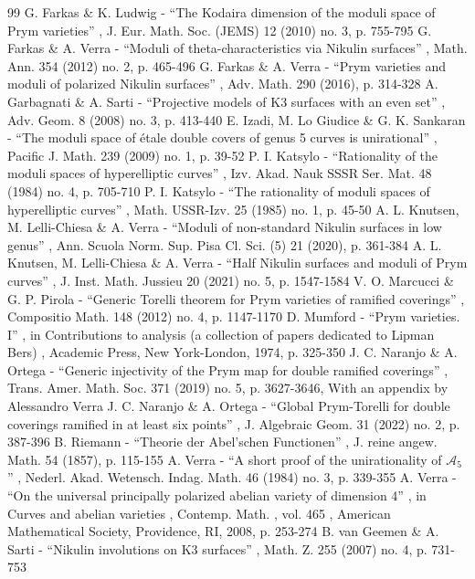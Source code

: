 \documentclass[11pt]{article}
\theoremstyle{plain}
\theoremstyle{definition}
\begin{document}
\begin{thebibliography}{99}
 G. Farkas \& K. Ludwig - “The Kodaira dimension of the moduli space of Prym varieties” , J. Eur. Math. Soc. (JEMS) 12 (2010) no. 3, p. 755-795
 G. Farkas \& A. Verra - “Moduli of theta-characteristics via Nikulin surfaces” , Math. Ann. 354 (2012) no. 2, p. 465-496
 G. Farkas \& A. Verra - “Prym varieties and moduli of polarized Nikulin surfaces” , Adv. Math. 290 (2016), p. 314-328
 A. Garbagnati \& A. Sarti - “Projective models of K3 surfaces with an even set” , Adv. Geom. 8 (2008) no. 3, p. 413-440
 E. Izadi, M. Lo Giudice \& G. K. Sankaran - “The moduli space of étale double covers of genus 5 curves is unirational” , Pacific J. Math. 239 (2009) no. 1, p. 39-52
 P. I. Katsylo - “Rationality of the moduli spaces of hyperelliptic curves” , Izv. Akad. Nauk SSSR Ser. Mat. 48 (1984) no. 4, p. 705-710
 P. I. Katsylo - “The rationality of moduli spaces of hyperelliptic curves” , Math. USSR-Izv. 25 (1985) no. 1, p. 45-50
 A. L. Knutsen, M. Lelli-Chiesa \& A. Verra - “Moduli of non-standard Nikulin surfaces in low genus” , Ann. Scuola Norm. Sup. Pisa Cl. Sci. (5) 21 (2020), p. 361-384
 A. L. Knutsen, M. Lelli-Chiesa \& A. Verra - “Half Nikulin surfaces and moduli of Prym curves” , J. Inst. Math. Jussieu 20 (2021) no. 5, p. 1547-1584
 V. O. Marcucci \& G. P. Pirola - “Generic Torelli theorem for Prym varieties of ramified coverings” , Compositio Math. 148 (2012) no. 4, p. 1147-1170
 D. Mumford - “Prym varieties. I” , in Contributions to analysis (a collection of papers dedicated to Lipman Bers) , Academic Press, New York-London, 1974, p. 325-350
 J. C. Naranjo \& A. Ortega - “Generic injectivity of the Prym map for double ramified coverings” , Trans. Amer. Math. Soc. 371 (2019) no. 5, p. 3627-3646, With an appendix by Alessandro Verra
 J. C. Naranjo \& A. Ortega - “Global Prym-Torelli for double coverings ramified in at least six points” , J. Algebraic Geom. 31 (2022) no. 2, p. 387-396
 B. Riemann - “Theorie der Abel’schen Functionen” , J. reine angew. Math. 54 (1857), p. 115-155
 A. Verra - “A short proof of the unirationality of ${\mathcal{A}}_5$” , Nederl. Akad. Wetensch. Indag. Math. 46 (1984) no. 3, p. 339-355
 A. Verra - “On the universal principally polarized abelian variety of dimension 4” , in Curves and abelian varieties , Contemp. Math. , vol. 465 , American Mathematical Society, Providence, RI, 2008, p. 253-274
 B. van Geemen \& A. Sarti - “Nikulin involutions on K3 surfaces” , Math. Z. 255 (2007) no. 4, p. 731-753
\end{thebibliography}
\end{document}
